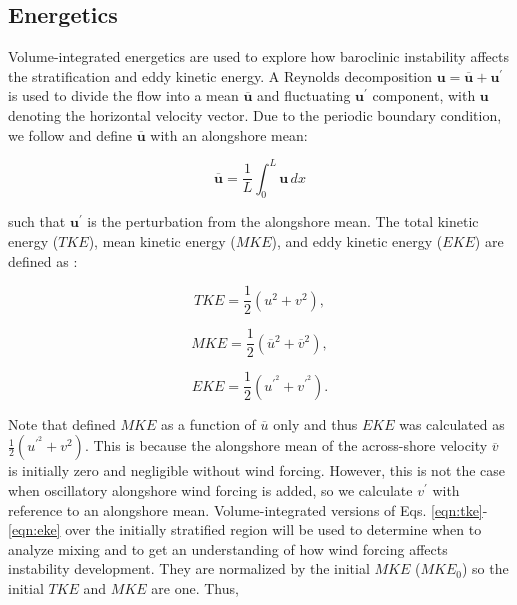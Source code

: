 \documentclass[draft]{agujournal2019}
\begin{document}
\subsection{Energetics}
Volume-integrated energetics are used to explore how baroclinic instability affects the stratification and eddy kinetic energy. A Reynolds decomposition $\mathbf{u}=\overline{\mathbf{u}}+\mathbf{u}^\prime$ is used to divide the flow into a mean $\overline{\mathbf{u}}$ and fluctuating $\mathbf{u}^\prime$ component, with $\mathbf{u}$ denoting the horizontal velocity vector. Due to the periodic boundary condition, we follow  and define $\overline{\mathbf{u}}$ with an alongshore mean:
\begin{linenomath*}
    \begin{equation}
    \overline{\mathbf{u}}=\frac{1}{L} \int_0^L \mathbf{u} \, dx
    \end{equation}
\end{linenomath*} 
such that $\mathbf{u}^\prime$ is the perturbation from the alongshore mean. The total kinetic energy ($TKE$), mean kinetic energy ($MKE$), and eddy kinetic energy ($EKE$) are defined as \cite{cushman2011introduction}:
\begin{linenomath*}
    \begin{equation} \label{eqn:tke}
        TKE = \frac{1}{2}(u^2+v^2) ,
    \end{equation}
\end{linenomath*}
\begin{linenomath*}
    \begin{equation} \label{eqn:mke}
        MKE = \frac{1}{2}(\overline{u}^2+\overline{v}^2) ,
    \end{equation}
\end{linenomath*}
\begin{linenomath*}
    \begin{equation} \label{eqn:eke}
        EKE = \frac{1}{2}(u^{\prime^2}+v^{\prime^2}) .
    \end{equation}
\end{linenomath*}
Note that  defined $MKE$ as a function of $\overline{u}$ only and thus $EKE$ was calculated as $\frac{1}{2}(u^{\prime^2}+v^{2})$. This is because the alongshore mean of the across-shore velocity $\overline{v}$ is initially zero and negligible without wind forcing. However, this is not the case when oscillatory alongshore wind forcing is added, so we calculate $v^\prime$ with reference to an alongshore mean. Volume-integrated versions of Eqs. \ref{eqn:tke}-\ref{eqn:eke} over the initially stratified region will be used to determine when to analyze mixing and to get an understanding of how wind forcing affects instability development. They are normalized by the initial $MKE$ ($MKE_0$) so the initial $TKE$ and $MKE$ are one. Thus, 
\end{document}
